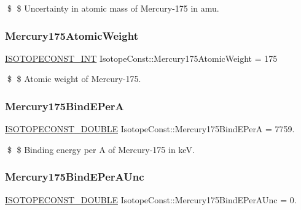 \$ \$ Uncertainty in atomic mass of Mercury-\/175 in amu. \mbox{\label{group___isotope_const-_mercury-_hg175_gae8ffdcfcc79bc3364e020044ec38a23b}} 
\subsubsection{\texorpdfstring{Mercury175\+Atomic\+Weight}{Mercury175AtomicWeight}}
{\footnotesize\ttfamily \mbox{\hyperlink{group___isotope_const-_macros_ga5f18360b3e99483a35c32d789e62621c}{I\+S\+O\+T\+O\+P\+E\+C\+O\+N\+S\+T\+\_\+\+I\+NT}} Isotope\+Const\+::\+Mercury175\+Atomic\+Weight = 175}

\$ \$ Atomic weight of Mercury-\/175. \mbox{\label{group___isotope_const-_mercury-_hg175_ga825669a116ccc09308a6f80302ffa518}} 
\subsubsection{\texorpdfstring{Mercury175\+Bind\+E\+PerA}{Mercury175BindEPerA}}
{\footnotesize\ttfamily \mbox{\hyperlink{group___isotope_const-_macros_ga8f45a7272ce02c0b4c65c44636ed719a}{I\+S\+O\+T\+O\+P\+E\+C\+O\+N\+S\+T\+\_\+\+D\+O\+U\+B\+LE}} Isotope\+Const\+::\+Mercury175\+Bind\+E\+PerA = 7759.}

\$ \$ Binding energy per A of Mercury-\/175 in keV. \mbox{\label{group___isotope_const-_mercury-_hg175_ga25872a64765b6aceb51bb6df654ef014}} 
\subsubsection{\texorpdfstring{Mercury175\+Bind\+E\+Per\+A\+Unc}{Mercury175BindEPerAUnc}}
{\footnotesize\ttfamily \mbox{\hyperlink{group___isotope_const-_macros_ga8f45a7272ce02c0b4c65c44636ed719a}{I\+S\+O\+T\+O\+P\+E\+C\+O\+N\+S\+T\+\_\+\+D\+O\+U\+B\+LE}} Isotope\+Const\+::\+Mercury175\+Bind\+E\+Per\+A\+Unc = 0.}

